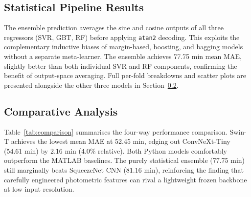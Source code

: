 \documentclass[9pt, a4paper, twocolumn]{article}
\begin{document}
\subsection{Statistical Pipeline Results}

The ensemble prediction averages the sine and cosine outputs of all three regressors (SVR, GBT, RF) before applying \texttt{atan2} decoding. This exploits the complementary inductive biases of margin-based, boosting, and bagging models without a separate meta-learner. The ensemble achieves 77.75 min mean MAE, slightly better than both individual SVR and RF components, confirming the benefit of output-space averaging. Full per-fold breakdowns and scatter plots are presented alongside the other three models in Section~\ref{sec:comparison}.


\subsection{Comparative Analysis}
\label{sec:comparison}

Table~\ref{tab:comparison} summarises the four-way performance comparison. Swin-T achieves the lowest mean MAE at 52.45 min, edging out ConvNeXt-Tiny (54.61 min) by 2.16 min (4.0\% relative). Both Python models comfortably outperform the MATLAB baselines. The purely statistical ensemble (77.75 min) still marginally beats SqueezeNet CNN (81.16 min), reinforcing the finding that carefully engineered photometric features can rival a lightweight frozen backbone at low input resolution.

\begin{table}[H]
\centering
\footnotesize
\caption{Four-way cross-pipeline comparison (5-fold mean MAE).}
\label{tab:comparison}
\end{table}
\end{document}
